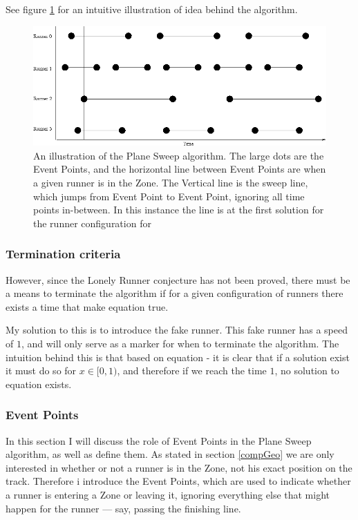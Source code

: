 See figure \ref{algoIlluImg} for an intuitive illustration of idea behind the algorithm. 

\begin{figure}[H]
  \centering
  \includegraphics[width=\textwidth]{./images/algoIlluPng}
  \caption{\label{algoIlluImg}An illustration of the Plane Sweep algorithm. The large dots are the Event Points, and the horizontal line between Event Points are when a given runner is in the Zone. The Vertical line is the sweep line, which jumps from Event Point to Event Point, ignoring all time points in-between. In this instance the line is at the first solution for the runner configuration for }
\end{figure}

\subsubsection{Termination criteria}
\label{termination}
However, since the Lonely Runner conjecture has not been proved, there must be a means to terminate the algorithm if for a given configuration of runners there exists a time that make equation  true.

My solution to this is to introduce the fake runner. This fake runner has a speed of $1$, and will only serve as a marker for when to terminate the algorithm. The intuition behind this is that based on equation  - it is clear that if a solution exist it must do so for $x \in [0,1)$, and therefore if we reach the time $1$, no solution to equation  exists. 

\subsubsection{Event Points}
\label{eventPoints}
In this section I will discuss the role of Event Points in the Plane Sweep algorithm, as well as define them. As stated in section \ref{compGeo} we are only interested in whether or not a runner is in the Zone, not his exact position on the track. Therefore i introduce the Event Points, which are used to indicate whether a runner is entering a Zone or leaving it, ignoring everything else that might happen for the runner --- say, passing the finishing line. 

